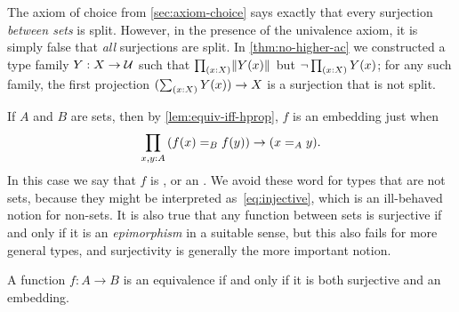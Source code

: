 \documentclass[hott-all.tex]{subfiles}
\begin{document}
The axiom of choice from \cref{sec:axiom-choice} says exactly that every surjection \emph{between sets} is split.
However, in the presence of the univalence axiom, it is simply false that \emph{all} surjections are split.
In \cref{thm:no-higher-ac} we constructed a type family $Y:X\to \mathcal{U}$ such that $\prd{x:X} \brck{Y(x)}$ but $\neg \prd{x:X} Y(x)$;
for any such family, the first projection $(\sm{x:X} Y(x)) \to X$ is a surjection that is not split.

If $A$ and $B$ are sets, then by \cref{lem:equiv-iff-hprop}, $f$ is an embedding just when
\begin{equation}
  \prd{x,y:A} (\id[B]{f(x)}{f(y)}) \to (\id[A]xy).\label{eq:injective}
\end{equation}
In this case we say that $f$ is ,
or an .
%
We avoid these word for types that are not sets, because they might be interpreted as~\eqref{eq:injective}, which is an ill-behaved notion for non-sets.
It is also true that any function between sets is surjective if and only if it is an \emph{epimorphism} in a suitable sense, but this also fails for more general types, and surjectivity is generally the more important notion.

\begin{thm}\label{thm:mono-surj-equiv}
  A function $f:A\to B$ is an equivalence if and only if it is both surjective and an embedding.
\end{thm}
%
\end{document}
